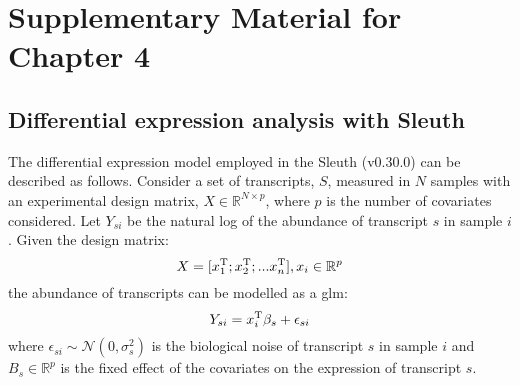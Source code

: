 \chapter{Supplementary Material for Chapter 4}

\section{Differential expression analysis with Sleuth}

The differential expression model employed in the Sleuth (v0.30.0) \cite{pimentelDifferentialAnalysisRNAseq2017,yiGenelevelDifferentialAnalysis2018} can be described as follows.
Consider a set of transcripts, $S$, measured in $N$ samples with an experimental design matrix, $X \in \mathbb{R}^{N \times p}$, where $p$ is the number of covariates considered.
Let $Y_{si}$ be the natural log of the abundance of transcript $s$ in sample $i$.
Given the design matrix:
%
\begin{equation}
  X = [x_1^{\mathrm{T}}; x_2^{\mathrm{T}}; ... x_n^{\mathrm{T}}], x_i \in \mathbb{R}^p
\end{equation}
%
the abundance of transcripts can be modelled as a \gls{glm}:
%
\begin{equation}
  Y_{si} = x_i^{\mathrm{T}} \beta_s + \epsilon_{si}
\end{equation}
%
where $\epsilon_{si} \sim \mathcal{N}(0, \sigma_s^2)$ is the biological noise of transcript $s$ in sample $i$ and $B_s \in \mathbb{R}^p$ is the fixed effect of the covariates on the expression of transcript $s$.

